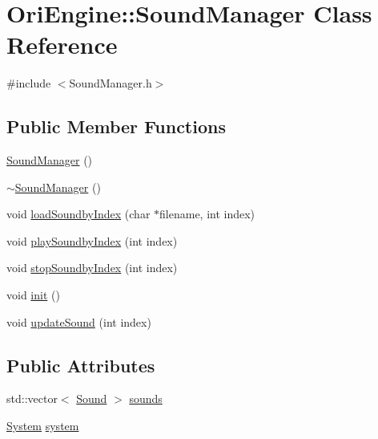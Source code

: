 \hypertarget{class_ori_engine_1_1_sound_manager}{}\section{Ori\+Engine\+:\+:Sound\+Manager Class Reference}
\label{class_ori_engine_1_1_sound_manager}


{\ttfamily \#include $<$Sound\+Manager.\+h$>$}

\subsection*{Public Member Functions}
\begin{DoxyCompactItemize}
\item 
\hyperlink{class_ori_engine_1_1_sound_manager_abcc1fbf3488be5788a42c9a4fe56df35}{Sound\+Manager} ()
\item 
\hyperlink{class_ori_engine_1_1_sound_manager_ad5dbf8eab22db48ff8f3db51b02f8938}{$\sim$\+Sound\+Manager} ()
\item 
void \hyperlink{class_ori_engine_1_1_sound_manager_a489e924e813bb17f740dfd4605599baa}{load\+Soundby\+Index} (char $\ast$filename, int index)
\item 
void \hyperlink{class_ori_engine_1_1_sound_manager_add98e983ee46bd07c790503339b87933}{play\+Soundby\+Index} (int index)
\item 
void \hyperlink{class_ori_engine_1_1_sound_manager_a5492c808a16860c1a04f9ad1309b0b91}{stop\+Soundby\+Index} (int index)
\item 
void \hyperlink{class_ori_engine_1_1_sound_manager_a6fbde6d8a9b132fea206fcfb4dd35990}{init} ()
\item 
void \hyperlink{class_ori_engine_1_1_sound_manager_a5da083b0b4feb1ae9c3c86823d5be196}{update\+Sound} (int index)
\end{DoxyCompactItemize}
\subsection*{Public Attributes}
\begin{DoxyCompactItemize}
\item 
std\+::vector$<$ \hyperlink{class_ori_engine_1_1_sound}{Sound} $>$ \hyperlink{class_ori_engine_1_1_sound_manager_a241dbad02456e387d20aa32694d8c5eb}{sounds}
\item 
\hyperlink{class_ori_engine_1_1_system}{System} \hyperlink{class_ori_engine_1_1_sound_manager_a0530694c6def60abba7c82da657b5398}{system}
\end{DoxyCompactItemize}


